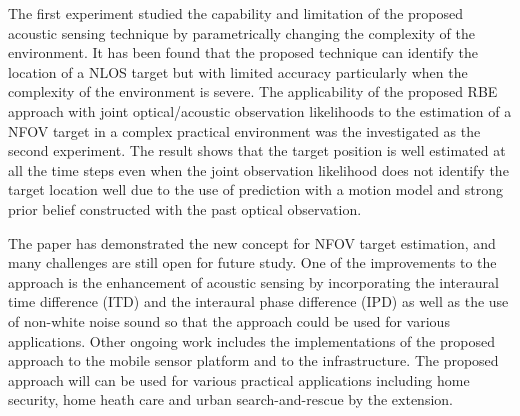 The first experiment studied the capability and limitation of the proposed acoustic sensing technique by parametrically changing the complexity of the environment.  It has been found that the proposed technique can identify the location of a NLOS target but with limited accuracy particularly when the complexity of the environment is severe.  The applicability of the proposed RBE approach with joint optical/acoustic observation likelihoods to the estimation of a NFOV target in a complex practical environment was the investigated as the second experiment.  The result shows that the target position is well estimated at all the time steps even when the joint observation likelihood does not identify the target location well due to the use of prediction with a motion model and strong prior belief constructed with the past optical observation.  

The paper has demonstrated the new concept for NFOV target estimation, and many challenges are still open for future study.  One of the improvements to the approach is the enhancement of acoustic sensing by incorporating the interaural time difference (ITD) and the interaural phase difference (IPD) as well as the use of non-white noise sound so that the approach could be used for various applications.  Other ongoing work includes the implementations of the proposed approach to the mobile sensor platform and to the infrastructure.  The proposed approach will can be used for various practical applications including home security, home heath care and urban search-and-rescue by the extension.  





